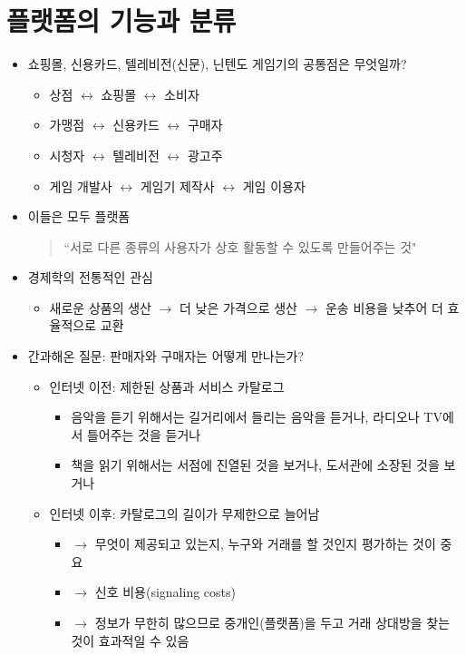 \section{플랫폼의 기능과 분류}\label{sec:}
\begin{itemize}
\item 쇼핑몰, 신용카드, 텔레비전(신문), 닌텐도 게임기의 공통점은 무엇일까? \cite[pp. 991--992]{Rochet:2006jl}
	\begin{itemize}
	\item 상점 $\leftrightarrow$ 쇼핑몰 $\leftrightarrow$ 소비자
	\item 가맹점 $\leftrightarrow$ 신용카드 $\leftrightarrow$ 구매자
	\item 시청자 $\leftrightarrow$ 텔레비전 $\leftrightarrow$ 광고주
	\item 게임 개발사 $\leftrightarrow$ 게임기 제작사 $\leftrightarrow$ 게임 이용자
	\end{itemize}
\item 이들은 모두 플랫폼 \cite[p. 13]{Cusumano:2019aa} 
	\begin{quote}
	``서로 다른 종류의 사용자가 상호 활동할 수 있도록 만들어주는 것"
	\end{quote}
\item 경제학의 전통적인 관심
	\begin{itemize}
	\item 새로운 상품의 생산 $\rightarrow$ 더 낮은 가격으로 생산 $\rightarrow$ 운송 비용을 낮추어 더 효율적으로 교환
	\end{itemize}
\item 간과해온 질문: 판매자와 구매자는 어떻게 만나는가? \cite[p. 380]{Tirole:2017aa}
	\begin{itemize}
	\item 인터넷 이전: 제한된 상품과 서비스 카탈로그
		\begin{itemize}
		\item 음악을 듣기 위해서는 길거리에서 들리는 음악을 듣거나, 라디오나 TV에서 틀어주는 것을 듣거나
		\item 책을 읽기 위해서는 서점에 진열된 것을 보거나, 도서관에 소장된 것을 보거나
		\end{itemize}
	\item 인터넷 이후: 카탈로그의 길이가 무제한으로 늘어남
		\begin{itemize}
		\item $\rightarrow$ 무엇이 제공되고 있는지, 누구와 거래를 할 것인지 평가하는 것이 중요
		\item $\rightarrow$ 신호 비용(signaling costs)
		\item $\rightarrow$ 정보가 무한히 많으므로 중개인(플랫폼)을 두고 거래 상대방을 찾는 것이 효과적일 수 있음

\end{itemize}
\end{itemize}
\end{itemize}
